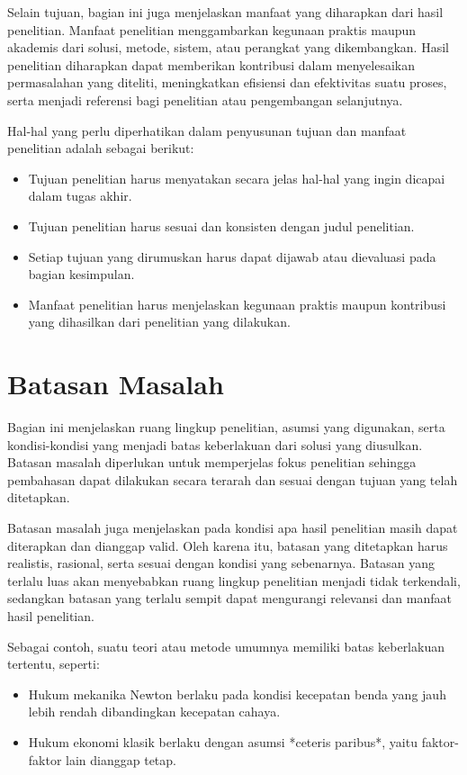 Selain tujuan, bagian ini juga menjelaskan manfaat yang diharapkan dari hasil penelitian. Manfaat penelitian menggambarkan kegunaan praktis maupun akademis dari solusi, metode, sistem, atau perangkat yang dikembangkan. Hasil penelitian diharapkan dapat memberikan kontribusi dalam menyelesaikan permasalahan yang diteliti, meningkatkan efisiensi dan efektivitas suatu proses, serta menjadi referensi bagi penelitian atau pengembangan selanjutnya.

Hal-hal yang perlu diperhatikan dalam penyusunan tujuan dan manfaat penelitian adalah sebagai berikut:

\begin{itemize}[topsep=0pt,itemsep=0pt,parsep=0pt,leftmargin=*]
\item Tujuan penelitian harus menyatakan secara jelas hal-hal yang ingin dicapai dalam tugas akhir.
\item Tujuan penelitian harus sesuai dan konsisten dengan judul penelitian.
\item Setiap tujuan yang dirumuskan harus dapat dijawab atau dievaluasi pada bagian kesimpulan.
\item Manfaat penelitian harus menjelaskan kegunaan praktis maupun kontribusi yang dihasilkan dari penelitian yang dilakukan.
\end{itemize}


\section{Batasan Masalah}
Bagian ini menjelaskan ruang lingkup penelitian, asumsi yang digunakan, serta kondisi-kondisi yang menjadi batas keberlakuan dari solusi yang diusulkan. Batasan masalah diperlukan untuk memperjelas fokus penelitian sehingga pembahasan dapat dilakukan secara terarah dan sesuai dengan tujuan yang telah ditetapkan.

Batasan masalah juga menjelaskan pada kondisi apa hasil penelitian masih dapat diterapkan dan dianggap valid. Oleh karena itu, batasan yang ditetapkan harus realistis, rasional, serta sesuai dengan kondisi yang sebenarnya. Batasan yang terlalu luas akan menyebabkan ruang lingkup penelitian menjadi tidak terkendali, sedangkan batasan yang terlalu sempit dapat mengurangi relevansi dan manfaat hasil penelitian.

Sebagai contoh, suatu teori atau metode umumnya memiliki batas keberlakuan tertentu, seperti:

\begin{itemize}[topsep=0pt,itemsep=0pt,parsep=0pt,leftmargin=*]
\item Hukum mekanika Newton berlaku pada kondisi kecepatan benda yang jauh lebih rendah dibandingkan kecepatan cahaya.
\item Hukum ekonomi klasik berlaku dengan asumsi *ceteris paribus*, yaitu faktor-faktor lain dianggap tetap.
\end{itemize}

